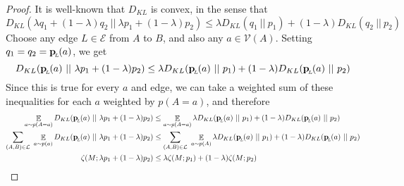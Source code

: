 \documentclass{article}
\newcommand{\bp}[1][L]{\mat{p}_{\!_#1\!}}
\newcommand{\Ed}{\mathcal E}
\numberwithin{equation}{section}
\begin{document}
	
	\thmzetaconvex*
	\begin{proof}
		It is well-known that $D_{KL}$ is convex, in the sense that 
		\[ D_{KL}(\lambda q_1 + (1-\lambda) q_2 \ ||\ \lambda p_1 + (1-\lambda) p_2) \leq \lambda D_{KL} (q_1\ ||\ p_1) + (1-\lambda) D_{KL}(q_2\ ||\ p_2) \]
		Choose any edge $L \in \Ed$ from $A$ to $B$, and also any $a \in \mathcal V(A)$. 
		Setting $q_1 = q_2 = \bp(a)$, we get
		\[ D_{KL}(\bp(a) \ ||\ \lambda p_1 + (1-\lambda) p_2) \leq \lambda D_{KL} (\bp(a) \ ||\ p_1) + (1-\lambda) D_{KL}(\bp(a)\ ||\ p_2) \]
		Since this is true for every $a$ and edge, we can take a weighted sum of these inequalities for each $a$ weighted by $p(A=a)$, and therefore
		\begin{align*}
			\E_{a\sim p(A=a)} D_{KL}(\bp(a) \ ||\ \lambda p_1 + (1-\lambda) p_2) &\leq \E_{a\sim p(A=a)}\lambda D_{KL} (\bp(a) \ ||\ p_1) + (1-\lambda) D_{KL}(\bp(a)\ ||\ p_2) \\
			\sum_{(A, B) \in \cal L}~\E_{a\sim p(a)} D_{KL}(\bp(a) \ ||\ \lambda p_1 + (1-\lambda) p_2) &\leq \sum_{(A, B) \in \cal L}~\E_{a\sim p(A)}\lambda D_{KL} (\bp(a) \ ||\ p_1) + (1-\lambda) D_{KL}(\bp(a)\ ||\ p_2) \\
			\zeta(M ; \lambda p_1 + (1-\lambda)p_2) &\leq \lambda \zeta(M;p_1) + (1-\lambda) \zeta(M;p_2)
		\end{align*}
	\end{proof}
	
\end{document}
